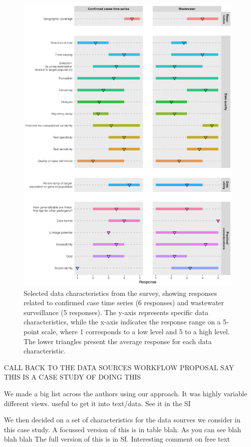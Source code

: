 \documentclass{article}
\begin{document}
%
\begin{figure}[H] 
\includegraphics[width=.97\linewidth]{figures/survey_responses.png}
\centering
\caption{ Selected data characteristics from the survey, showing responses related to confirmed case time series (6 responses) and wastewater surveillance (5 responses). The y-axis represents specific data characteristics, while the x-axis indicates the response range on a 5-point scale, where 1 corresponds to a low level and 5 to a high level. The lower triangles present the average response for each data characteristic.}
\label{survey_responses}
\end{figure}

CALL BACK TO THE DATA SOURCES WORKFLOW PROPOSAL
SAY THIS IS A CASE STUDY OF DOING THIS

We made a big list across the authors using our approach. It was highly variable different views. useful to get it into text/data. See it in the SI

We then decided on a set of characteristics for the data sourves we consider in this case study. A focussed version of this is in table blah. As you can see blah blah blah
The full version of this is in SI. Interesting comment on free text
\end{document}
